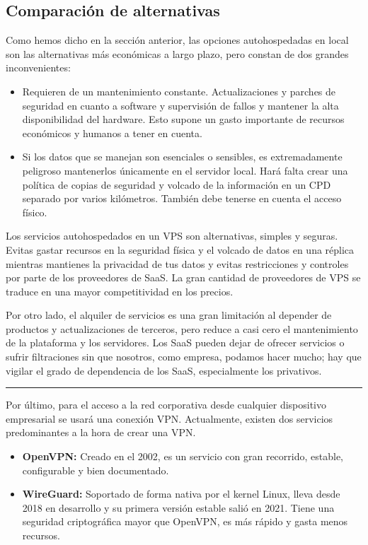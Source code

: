 \subsection{Comparación de alternativas}
Como hemos dicho en la sección anterior, las opciones autohospedadas en local son las alternativas más económicas a largo plazo, pero constan de dos grandes inconvenientes:
\begin{itemize}
    \item Requieren de un mantenimiento constante. Actualizaciones y parches de seguridad en cuanto a software y supervisión de fallos y mantener la alta disponibilidad del hardware. Esto supone un gasto importante de recursos económicos y humanos a tener en cuenta.
    \item Si los datos que se manejan son esenciales o sensibles, es extremadamente peligroso mantenerlos únicamente en el servidor local. Hará falta crear una política de copias de seguridad y volcado de la información en un CPD separado por varios kilómetros. También debe tenerse en cuenta el acceso físico.
\end{itemize}

Los servicios autohospedados en un VPS son alternativas, simples y seguras. Evitas gastar recursos en la seguridad física y el volcado de datos en una réplica mientras mantienes la privacidad de tus datos y evitas restricciones y controles por parte de los proveedores de SaaS. La gran cantidad de proveedores de VPS se traduce en una mayor competitividad en los precios.

Por otro lado, el alquiler de servicios es una gran limitación al depender de productos y actualizaciones de terceros, pero reduce a casi cero el mantenimiento de la plataforma y los servidores. Los SaaS pueden dejar de ofrecer servicios o sufrir filtraciones sin que nosotros, como empresa, podamos hacer mucho; hay que vigilar el grado de dependencia de los SaaS, especialmente los privativos.

\begin{center}
\noindent\rule{5cm}{0.5pt}
\end{center}

Por último, para el acceso a la red corporativa desde cualquier dispositivo empresarial se usará una conexión VPN. Actualmente, existen dos servicios predominantes a la hora de crear una VPN.
\begin{itemize}
    \item \textbf{OpenVPN:} Creado en el 2002, es un servicio con gran recorrido, estable, configurable y bien documentado.
    \item \textbf{WireGuard:} Soportado de forma nativa por el kernel Linux, lleva desde 2018 en desarrollo y su primera versión estable salió en 2021. Tiene una seguridad criptográfica mayor que OpenVPN, es más rápido y gasta menos recursos.\cite{lipp2019mechanised}
\end{itemize}


